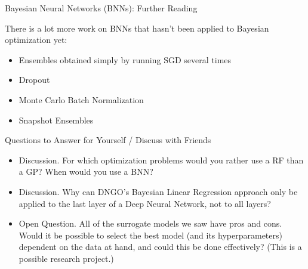 \begin{frame}[c]{Bayesian Neural Networks (BNNs): Further Reading}

There is a lot more work on BNNs that hasn't been applied to Bayesian optimization yet:
\begin{itemize}
        \item Ensembles obtained simply by running SGD several times 
        \item Dropout  
        \item Monte Carlo Batch Normalization  %
        \item Snapshot Ensembles  
\end{itemize}


\end{frame}
\begin{frame}[c]{Questions to Answer for Yourself / Discuss with Friends}

\begin{itemize}
    \item \alert{Discussion.} For which optimization problems would you rather use a RF than a GP? When would you use a BNN?
\medskip
    \item \alert{Discussion.} Why can DNGO's Bayesian Linear Regression approach only be applied to the last layer of a Deep Neural Network, not to all layers?
\medskip    
    \item \alert{Open Question.} All of the surrogate models we saw have pros and cons. Would it be possible to select the best model (and its hyperparameters) dependent on the data at hand, and could this be done effectively? (This is a possible research project.)

\end{itemize}
\end{frame}